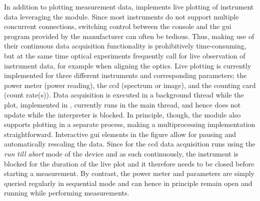 In addition to plotting measurement data, \mjolnir implements live plotting of instrument data leveraging the  module.
Since most instruments do not support multiple concurrent connections, switching control between the \python console and the \gls{gui} program provided by the manufacturer can often be tedious.
Thus, making use of their continuous data acquisition functionality is prohibitively time-consuming, but at the same time optical experiments frequently call for live observation of instrument data, for example when aligning the optics.
Live plotting is currently implemented for three different instruments and corresponding parameters; the \thorlabspowermeter power meter (power reading), the \theccd \gls{ccd} (spectrum or image), and the \tagger counting card (count rate(s)).
Data acquisition is executed in a background thread while the plot, implemented in \matplotlib, currently runs in the main thread, and hence does not update while the interpreter is blocked.
In principle, though, the  module also supports plotting in a separate process, making a multiprocessing implementation straightforward.
Interactive \gls{gui} elements in the \matplotlib figure allow for pausing and automatically rescaling the data.
Since for the \gls{ccd} data acquisition runs using the \emph{run till abort} mode of the device and as such continuously, the instrument is blocked for the duration of the live plot and it therefore needs to be closed before starting a measurement.
By contrast, the power meter and \taggershort parameters are simply queried regularly in sequential mode and can hence in principle remain open and running while performing measurements.
